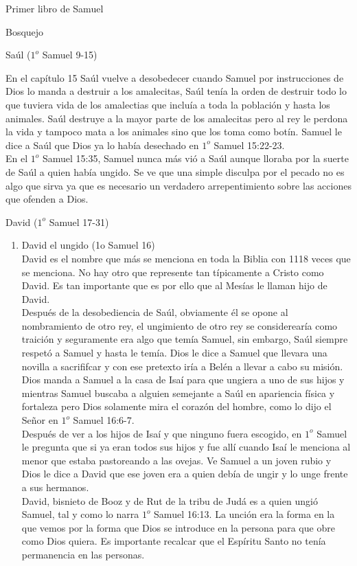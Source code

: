 \begin{section}{Primer libro de Samuel}
\begin{subsection}{Bosquejo}
\begin{subsubsection}{Saúl ($1^{o}$ Samuel 9-15)}
\begin{enumerate}
\newpage
			En el capítulo 15 Saúl vuelve a desobedecer cuando Samuel por instrucciones de Dios lo manda a destruir a los amalecitas, Saúl tenía la orden de destruir todo lo que tuviera vida de los amalectias que incluía a toda la población y hasta los animales. Saúl destruye a la mayor parte de los amalecitas pero al rey le perdona la vida y tampoco mata a los animales sino que los toma como botín. Samuel le dice a Saúl que Dios ya lo había desechado en $1^{o}$ Samuel 15:22-23.\\
			En el $1^{o}$ Samuel 15:35, Samuel nunca más vió a Saúl aunque lloraba por la suerte de Saúl a quien había ungido. Se ve que una simple disculpa por el pecado no es algo que sirva ya que es necesario un verdadero arrepentimiento sobre las acciones que ofenden a Dios.
	\end{enumerate}
		\end{subsubsection}
		\begin{subsubsection}{David ($1^{o}$ Samuel 17-31)}
			\begin{enumerate}
				\item David el ungido (1o Samuel 16)\\
					David es el nombre que más se menciona en toda la Biblia con 1118 veces que se menciona. No hay otro que represente tan típicamente a Cristo como David. Es tan importante que es por ello que al Mesías le llaman hijo de David.\\
					Después de la desobediencia de Saúl, obviamente él se opone al nombramiento de otro rey, el ungimiento de otro rey se considerearía como traición y seguramente era algo que temía Samuel, sin embargo, Saúl siempre respetó a Samuel y hasta le temía. Dios le dice a Samuel que llevara una novilla a sacrififcar y con ese pretexto iría a Belén a llevar a cabo su misión.\\
					Dios manda a Samuel a la casa de Isaí para que ungiera a uno de sus hijos y mientras Samuel buscaba a alguien semejante a Saúl en apariencia física y fortaleza pero Dios solamente mira el corazón del hombre, como lo dijo el Señor en $1^{o}$ Samuel 16:6-7. \\
					Después de ver a los hijos de Isaí y que ninguno fuera escogido, en $1^{o}$ Samuel le pregunta que si ya eran todos sus hijos y fue allí cuando Isaí le menciona al menor que estaba pastoreando a las ovejas. Ve Samuel a un joven rubio y Dios le dice a David que ese joven era a quien debía de ungir y lo unge frente a sus hermanos.\\
					David, bisnieto de Booz y de Rut de la tribu de Judá es a quien ungió Samuel, tal y como lo narra $1^{o}$ Samuel 16:13. La unción era la forma en la que vemos por la forma que Dios se introduce en la persona para que obre como Dios quiera. Es importante recalcar que el Espíritu Santo no tenía permanencia en las personas. \\

\end{enumerate}
\end{subsubsection}
\end{subsection}
\end{section}
